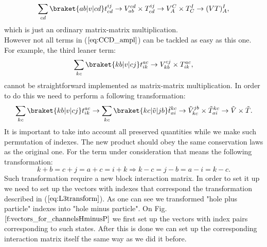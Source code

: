 \begin{equation}
\sum_{cd}\braket{ab|v|cd}t_{cd}^{ij} \rightarrow V_{ab}^{cd} \times T_{cd}^{ij} \rightarrow V_{A}^{C} \times T_{C}^{I} \rightarrow (VT)_{A}^{I},
\end{equation}
which is just an ordinary matrix-matrix multiplication.\\
However not all terms in  ($\ref{eq:CCD_ampl}$) can be tackled as easy as this one. For example, the third leaner term:
\begin{align}
\sum_{kc}\braket{kb|v|cj}t_{ik}^{ac} \rightarrow V_{kb}^{cj} \times T_{ik}^{ac},
\end{align}
cannot be straightforward implemented as matrix-matrix multiplication. In order to do this we need to perform a following transformation:
\begin{align}
\sum_{kc}\braket{kb|v|cj}t_{ik}^{ac} \rightarrow \sum_{kc}\braket{kc|\tilde{v}|jb}\tilde{t}_{ai}^{kc} \rightarrow \tilde{V}_{kc}^{jb}\times \tilde{T}_{ai}^{kc} \rightarrow \tilde{V}\times\tilde{T}.
\end{align}
It is important to take into account all preserved quantities while we make such permutation of indexes. The new product should obey the same conservation laws as the original one. For the term under consideration that means the following transformation:
\begin{equation}\label{eq:L3transform}
k+b=c+j=a+c=i+k \Rightarrow k-c=j -b=a-i=k-c.
\end{equation}
Such transformation require a new block interaction matrix. In order to set it up we need to set up the vectors with indexes that correspond the transformation described in ($\ref{eq:L3transform}$). As one can see we transformed "hole plus particle" indexes into "hole minus particle". On Fig. $\ref{f:vectors_for_channelsHminusP}$ we first set up the vectors with index pairs corresponding to such states. After this is done we can set up the corresponding interaction matrix itself the same way as we did it before. 

